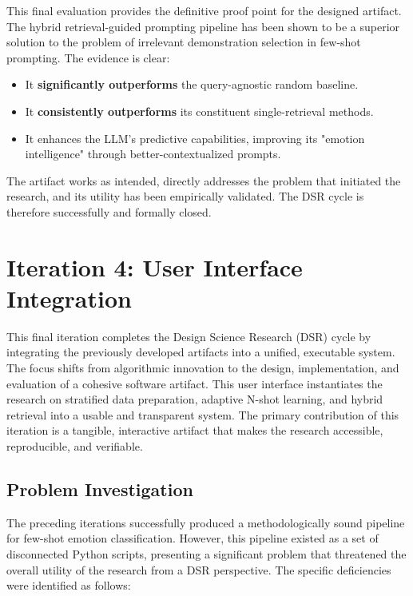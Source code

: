 This final evaluation provides the definitive proof point for the designed artifact. The hybrid retrieval-guided prompting pipeline has been shown to be a superior solution to the problem of irrelevant demonstration selection in few-shot prompting. The evidence is clear:
\begin{itemize}
    \item It \textbf{significantly outperforms} the query-agnostic random baseline.
    \item It \textbf{consistently outperforms} its constituent single-retrieval methods.
    \item It enhances the LLM's predictive capabilities, improving its "emotion intelligence" through better-contextualized prompts.
\end{itemize} 

The artifact works as intended, directly addresses the problem that initiated the research, and its utility has been empirically validated. The DSR cycle is therefore successfully and formally closed.

\section{Iteration 4: User Interface Integration}
\label{sec:iteration4}

This final iteration completes the Design Science Research (DSR) cycle by integrating the previously developed artifacts into a unified, executable system. The focus shifts from algorithmic innovation to the design, implementation, and evaluation of a cohesive software artifact. This user interface instantiates the research on stratified data preparation, adaptive N-shot learning, and hybrid retrieval into a usable and transparent system. The primary contribution of this iteration is a tangible, interactive artifact that makes the research accessible, reproducible, and verifiable.

\subsection{Problem Investigation}
\label{subsec:problem_investigation}

The preceding iterations successfully produced a methodologically sound pipeline for few-shot emotion classification. However, this pipeline existed as a set of disconnected Python scripts, presenting a significant problem that threatened the overall utility of the research from a DSR perspective. The specific deficiencies were identified as follows:

